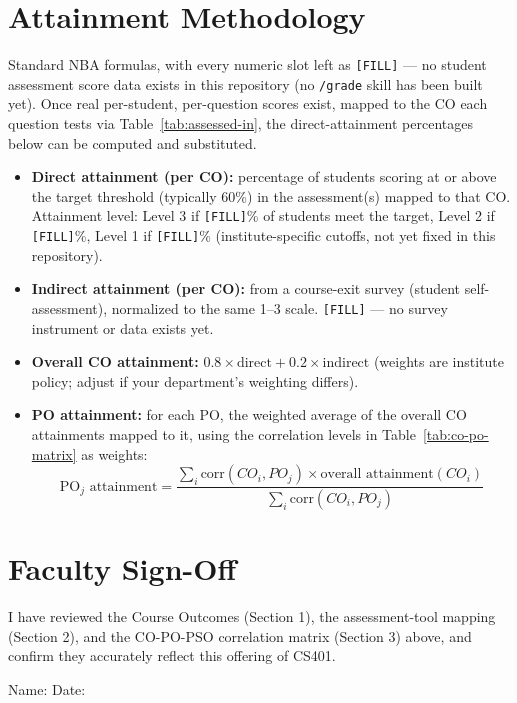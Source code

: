 \documentclass[11pt]{article}
\begin{document}
\section{Attainment Methodology}
\label{sec:attainment}

Standard NBA formulas, with every numeric slot left as \texttt{[FILL]} --- no student assessment score data exists in this repository (no \texttt{/grade} skill has been built yet). Once real per-student, per-question scores exist, mapped to the CO each question tests via Table~\ref{tab:assessed-in}, the direct-attainment percentages below can be computed and substituted.

\begin{itemize}
  \item \textbf{Direct attainment (per CO):} percentage of students scoring at or above the target threshold (typically 60\%) in the assessment(s) mapped to that CO. Attainment level: Level 3 if \texttt{[FILL]}\% of students meet the target, Level 2 if \texttt{[FILL]}\%, Level 1 if \texttt{[FILL]}\% (institute-specific cutoffs, not yet fixed in this repository).
  \item \textbf{Indirect attainment (per CO):} from a course-exit survey (student self-assessment), normalized to the same 1--3 scale. \texttt{[FILL]} --- no survey instrument or data exists yet.
  \item \textbf{Overall CO attainment:} $0.8 \times \text{direct} + 0.2 \times \text{indirect}$ (weights are institute policy; adjust if your department's weighting differs).
  \item \textbf{PO attainment:} for each PO, the weighted average of the overall CO attainments mapped to it, using the correlation levels in Table~\ref{tab:co-po-matrix} as weights:
  \[
    \text{PO}_j\text{ attainment} = \frac{\sum_{i} \text{corr}(CO_i, PO_j) \times \text{overall attainment}(CO_i)}{\sum_{i} \text{corr}(CO_i, PO_j)}
  \]
\end{itemize}

\section{Faculty Sign-Off}

I have reviewed the Course Outcomes (Section 1), the assessment-tool mapping (Section 2), and the CO-PO-PSO correlation matrix (Section 3) above, and confirm they accurately reflect this offering of CS401.

\bigskip
\noindent Name: \underline{\hspace{6cm}} \hfill Date: \underline{\hspace{3cm}}
\end{document}
